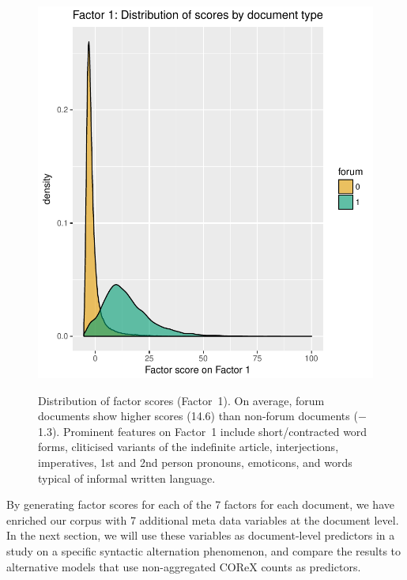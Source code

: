 \begin{figure}
   \includegraphics[scale=.95]{../R/plots/forum-factor1.pdf}
   \label{forum-factor1}
  \caption{Distribution of factor scores (Factor~1). On average, forum documents show higher scores (14.6) than non-forum documents ($-$1.3). Prominent features on Factor~1 include short/contracted word forms, cliticised variants of the indefinite article, interjections, imperatives, 1st and 2nd person pronouns, emoticons, and words typical of informal written language.}  
\end{figure}

By generating factor scores for each of the 7 factors for each document, we have enriched our corpus with 7 additional meta data variables at the document level.
In the next section, we will use these variables as document-level predictors in a study on a specific syntactic alternation phenomenon, and compare the results to alternative models that use non-aggregated COReX counts as predictors.





